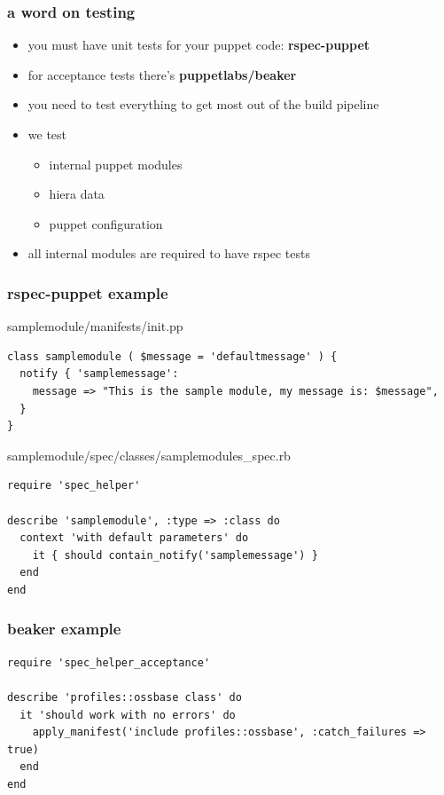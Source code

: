 \documentclass{beamer}
\begin{document}
\begin{frame}
  \frametitle{a word on testing}

  \begin{itemize}
  \item you must have unit tests for your puppet code: \textbf{rspec-puppet}
  \item for acceptance tests there's \textbf{puppetlabs/beaker}
  \item you need to test everything to get most out of the build
    pipeline
  \item we test
    \begin{itemize}
    \item internal puppet modules
    \item hiera data
    \item puppet configuration
    \end{itemize}
    \item all internal modules are required to have rspec tests
  \end{itemize}
\end{frame}

\begin{frame}
  \frametitle{rspec-puppet example}

  samplemodule/manifests/init.pp

\begin{lstlisting}
class samplemodule ( $message = 'defaultmessage' ) {
  notify { 'samplemessage':
    message => "This is the sample module, my message is: $message",
  }
}
\end{lstlisting}

  samplemodule/spec/classes/samplemodules\_spec.rb

  \begin{lstlisting}
require 'spec_helper'

describe 'samplemodule', :type => :class do
  context 'with default parameters' do
    it { should contain_notify('samplemessage') }
  end
end
  \end{lstlisting}

\end{frame}

\begin{frame}[fragile]
  \frametitle{beaker example}

\begin{lstlisting}
require 'spec_helper_acceptance'

describe 'profiles::ossbase class' do
  it 'should work with no errors' do
    apply_manifest('include profiles::ossbase', :catch_failures => true)
  end
end
\end{lstlisting}

\end{frame}
\end{document}
